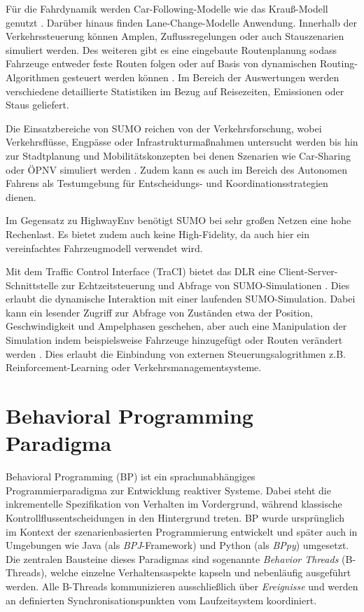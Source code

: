 Für die Fahrdynamik werden Car-Following-Modelle wie das Krauß-Modell genutzt \cite{sumo_car_following}. Darüber hinaus finden Lane-Change-Modelle Anwendung. Innerhalb der Verkehrssteuerung können Amplen, Zuflussregelungen oder auch Stauszenarien simuliert werden. Des weiteren gibt es eine eingebaute Routenplanung sodass Fahrzeuge entweder feste Routen folgen oder auf Basis von dynamischen Routing-Algorithmen gesteuert werden können \cite{sumo_vehicles}. Im Bereich der Auswertungen werden verschiedene detaillierte Statistiken im Bezug auf Reisezeiten, Emissionen oder Staus geliefert.

Die Einsatzbereiche von SUMO reichen von der Verkehrsforschung, wobei Verkehrsflüsse, Engpässe oder Infrastrukturmaßnahmen untersucht werden bis hin zur Stadtplanung und Mobilitätskonzepten bei denen Szenarien wie Car-Sharing oder ÖPNV simuliert werden \cite{SUMO2018}. Zudem kann es auch im Bereich des Autonomen Fahrens als Testumgebung für Entscheidungs- und Koordinationsstrategien dienen.

Im Gegensatz zu HighwayEnv benötigt SUMO bei sehr großen Netzen eine hohe Rechenlast. Es bietet zudem auch keine High-Fidelity, da auch hier ein vereinfachtes Fahrzeugmodell verwendet wird.

Mit dem Traffic Control Interface (TraCI) bietet das DLR eine Client-Server-Schnittstelle zur Echtzeitsteuerung und Abfrage von SUMO-Simulationen \cite{sumo_traci}. Dies erlaubt die dynamische Interaktion mit einer laufenden SUMO-Simulation. Dabei kann ein lesender Zugriff zur Abfrage von Zuständen etwa der Position, Geschwindigkeit und Ampelphasen geschehen, aber auch eine Manipulation der Simulation indem beispielsweise Fahrzeuge hinzugefügt oder Routen verändert werden \cite{sumo_traci}. Dies erlaubt die Einbindung von externen Steuerungsalogrithmen z.B. Reinforcement-Learning oder Verkehrsmanagementsysteme.

\section{Behavioral Programming Paradigma}\label{sec:behavioral-programming}
Behavioral Programming (BP) ist ein sprachunabhängiges Programmierparadigma zur Entwicklung reaktiver Systeme\cite{Harel2012}.
Dabei steht die inkrementelle Spezifikation von Verhalten im Vordergrund, während klassische Kontrollflussentscheidungen in den Hintergrund treten\cite{Harel2012}.
BP wurde ursprünglich im Kontext der szenarienbasierten Programmierung entwickelt und später auch in Umgebungen wie Java (als \emph{BPJ}-Framework) und Python (als \emph{BPpy}) umgesetzt\cite{Harel2010}.
Die zentralen Bausteine dieses Paradigmas sind sogenannte \emph{Behavior Threads} (B-Threads), welche einzelne Verhaltensaspekte kapseln und nebenläufig ausgeführt werden\cite{Harel2010}.
Alle B-Threads kommunizieren ausschließlich über \emph{Ereignisse} und werden an definierten Synchronisationspunkten vom Laufzeitsystem koordiniert\cite{Harel2012}.


